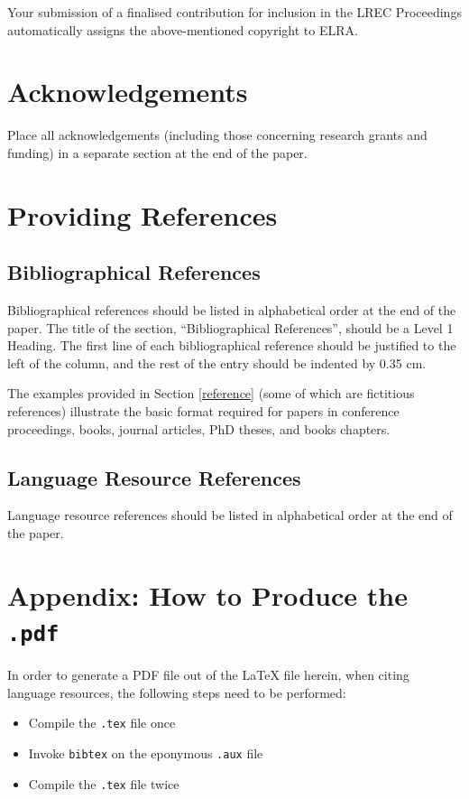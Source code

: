 \documentclass[10pt, a4paper]{article}
\begin{document}
Your submission of a finalised contribution for inclusion in the LREC Proceedings automatically assigns the above-mentioned copyright to ELRA.

\section{Acknowledgements}

Place all acknowledgements (including those concerning research grants and funding) in a separate section at the end of the paper.

\section{Providing References}

\subsection{Bibliographical References} 
Bibliographical references should be listed in alphabetical order at the end of the paper. The title of the section, ``Bibliographical References'', should be a Level 1 Heading. The first line of each bibliographical reference should be justified to the left of the column, and the rest of the entry should be indented by 0.35 cm.

The examples provided in Section \ref{reference} (some of which are fictitious references) illustrate the basic format required for papers in conference proceedings, books, journal articles, PhD theses, and books chapters.

\subsection{Language Resource References}

Language resource references should be listed in alphabetical order at the end of the paper.

\section*{Appendix: How to Produce the \texttt{.pdf}}

In order to generate a PDF file out of the LaTeX file herein, when citing language resources, the following steps need to be performed:

\begin{itemize}
    \item{Compile the \texttt{.tex} file once}
    \item{Invoke \texttt{bibtex} on the eponymous \texttt{.aux} file}
    \item{Compile the \texttt{.tex} file twice}
\end{itemize}
\end{document}
